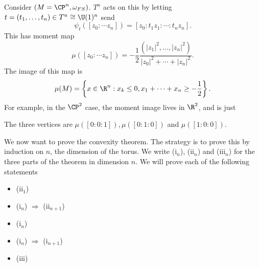 \documentclass[a4paper]{article}
\begin{document}
\begin{eg}
  Consider $(M = \CP^n, \omega_{FS})$. $T^n$ acts on this by letting $t = (t_1, \ldots, t_n) \in T^n \cong \U(1)^n$ send
  \[
    \psi_t([z_0: \cdots z_n]) = [z_0: t_1 z_1: \cdots :t_n z_n].
  \]
  This has moment map
  \[
    \mu([z_0: \cdots z_n]) = -\frac{1}{2} \frac{(|z_1|^2, \ldots, |z_n|^2)}{|z_0|^2 + \cdots + |z_n|^2}.
  \]
  The image of this map is
  \[
    \mu(M) = \left\{x \in \R^n: x_k \leq 0, x_1 + \cdots + x_n \geq -\frac{1}{2}\right\}.
  \]
  For example, in the $\CP^2$ case, the moment image lives in $\R^2$, and is just
  \begin{center}
  \end{center}
  The three vertices are $\mu([0:0:1]), \mu([0:1:0])$ and $\mu([1:0:0])$.
\end{eg}

We now want to prove the convexity theorem. The strategy is to prove this by induction on $n$, the dimension of the torus. We write (i$_n$), (ii$_n$) and (iii$_n$) for the three parts of the theorem in dimension $n$. We will prove each of the following statements
\begin{itemize}
  \item (ii$_1$)
  \item (i$_n$) $\Rightarrow$ (ii$_{n + 1}$)
  \item (i$_n$)
  \item (i$_n$) $\Rightarrow$ (i$_{n + 1}$)
  \item (iii)
\end{itemize}
\end{document}
